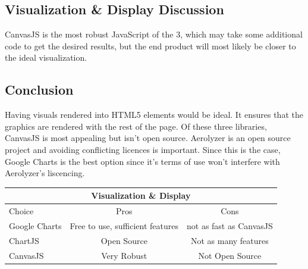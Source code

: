 \documentclass[onecolumn, draftclsnofoot,10pt, compsoc]{IEEEtran}
\begin{document}
\begin{singlespace}
\subsection{Visualization \& Display Discussion}
CanvasJS is the most robust JavaScript of the 3, which may take some additional code to get the desired results, but the end product will most likely be closer to the ideal visualization. \cite{CanvasJS}
\subsection{Conclusion}
Having visuals rendered into HTML5 elements would be ideal.
It ensures that the graphics are rendered with the rest of the page.
Of these three libraries, CanvasJS is most appealing but isn't open source.
Aerolyzer is an open source project and avoiding conflicting licences is important.
Since this is the case, Google Charts is the best option since it's terms of use won't interfere with Aerolyzer's liscencing.\cite{GoogleCh}\cite{CanvasJS}
\begin{center}
	\begin{tabular}{|l|c|c|} 
		\hline
		\multicolumn{3}{|c|}{Visualization \& Display} \\
		\hline
		Choice & Pros & Cons\\ [0.5ex] 
		\hline\hline
		Google Charts & Free to use, sufficient features & not as fast as CanvasJS \\ 
		\hline
		ChartJS & Open Source & Not as many features\\
		\hline
		CanvasJS & Very Robust & Not Open Source\\ [1ex] 
		\hline
	\end{tabular}
\end{center}
	
	
	

\end{singlespace}
\end{document}
